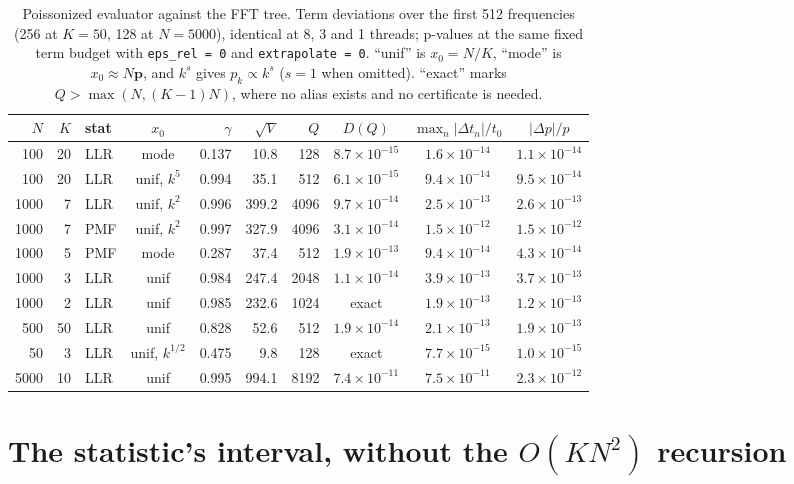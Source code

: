 \documentclass[11pt]{article}
\begin{document}
\begin{table}[t]
\centering
\small
\begin{tabular}{rrlcrrrccc}
\toprule
$N$ & $K$ & stat & $x_0$ & $\gamma$ & $\sqrt V$ & $Q$ & $D(Q)$ & $\max_n|\Delta t_n|/t_0$ & $|\Delta p|/p$ \\
\midrule
100  & 20 & LLR & mode           & 0.137 & 10.8  & 128  & $8.7\times10^{-15}$ & $1.6\times10^{-14}$ & $1.1\times10^{-14}$ \\
100  & 20 & LLR & unif, $k^5$    & 0.994 & 35.1  & 512  & $6.1\times10^{-15}$ & $9.4\times10^{-14}$ & $9.5\times10^{-14}$ \\
1000 & 7  & LLR & unif, $k^2$    & 0.996 & 399.2 & 4096 & $9.7\times10^{-14}$ & $2.5\times10^{-13}$ & $2.6\times10^{-13}$ \\
1000 & 7  & PMF & unif, $k^2$    & 0.997 & 327.9 & 4096 & $3.1\times10^{-14}$ & $1.5\times10^{-12}$ & $1.5\times10^{-12}$ \\
1000 & 5  & PMF & mode           & 0.287 & 37.4  & 512  & $1.9\times10^{-13}$ & $9.4\times10^{-14}$ & $4.3\times10^{-14}$ \\
1000 & 3  & LLR & unif           & 0.984 & 247.4 & 2048 & $1.1\times10^{-14}$ & $3.9\times10^{-13}$ & $3.7\times10^{-13}$ \\
1000 & 2  & LLR & unif           & 0.985 & 232.6 & 1024 & exact & $1.9\times10^{-13}$ & $1.2\times10^{-13}$ \\
500  & 50 & LLR & unif           & 0.828 & 52.6  & 512  & $1.9\times10^{-14}$ & $2.1\times10^{-13}$ & $1.9\times10^{-13}$ \\
50   & 3  & LLR & unif, $k^{1/2}$& 0.475 & 9.8   & 128  & exact & $7.7\times10^{-15}$ & $1.0\times10^{-15}$ \\
5000 & 10 & LLR & unif           & 0.995 & 994.1 & 8192 & $7.4\times10^{-11}$ & $7.5\times10^{-11}$ & $2.3\times10^{-12}$ \\
\bottomrule
\end{tabular}
\caption{Poissonized evaluator against the FFT tree. Term deviations over the first 512 frequencies
(256 at $K=50$, 128 at $N=5000$), identical at 8, 3 and 1 threads; p-values at the same fixed term
budget with \texttt{eps\_rel = 0} and \texttt{extrapolate = 0}. ``unif'' is $x_0=N/K$, ``mode'' is
$x_0\approx N\mathbf p$, and $k^s$ gives $p_k\propto k^s$ ($s=1$ when omitted). ``exact'' marks
$Q>\max(N,(K-1)N)$, where no alias exists and no certificate is needed.}
\label{tab:verify}
\end{table}

\section{The statistic's interval, without the $O(KN^2)$ recursion}
\label{sec:interval}
\end{document}
